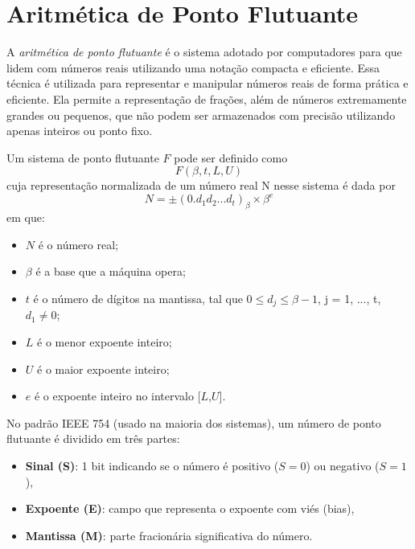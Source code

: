 \section{Aritmética de Ponto Flutuante}

A \textit{aritmética de ponto flutuante} é o sistema adotado por computadores para que lidem com números reais utilizando uma notação compacta e eficiente. Essa técnica é utilizada para representar e manipular números reais de forma prática e eficiente. Ela permite a representação de frações, além de números extremamente grandes ou pequenos, que não podem ser armazenados com precisão utilizando apenas inteiros ou ponto fixo.


Um sistema de ponto flutuante $F$ pode ser definido como
\[
F(\beta, t, L, U)\]
cuja representação normalizada de um número real N nesse sistema é dada por
\[
N = \pm (0.d_{1}d_{2} . . . d_{t})_\beta \times \beta^e 
\]
em que:

\begin{itemize}
  \item \( N \) é o número real;
  \item \(\beta\) é a base que a máquina opera;
  \item \( t \) é o número de dígitos na mantissa, tal que \( 0 \leq d_{j} \leq \beta-1 \), j = 1, ..., t, \(d_{1} \neq 0\);
  \item \( L \) é o menor expoente inteiro;
  \item \( U \) é o maior expoente inteiro;
  \item \( e \) é o expoente inteiro no intervalo [\( L \),\( U \)].
\end{itemize}


No padrão IEEE 754 (usado na maioria dos sistemas), um número de ponto flutuante é dividido em três partes:

\begin{itemize}
  \item \textbf{Sinal (S)}: 1 bit indicando se o número é positivo (\( S = 0 \)) ou negativo (\( S = 1 \)),
  \item \textbf{Expoente (E)}: campo que representa o expoente com viés (bias),
  \item \textbf{Mantissa (M)}: parte fracionária significativa do número.
\end{itemize}


